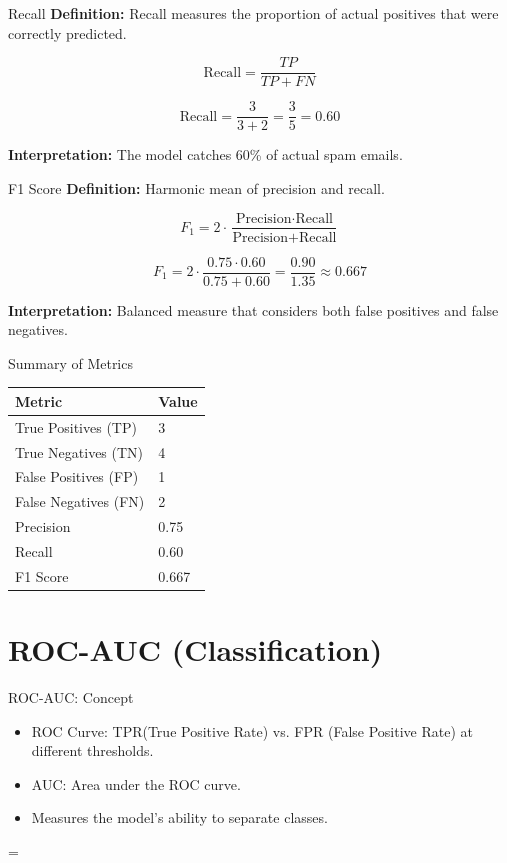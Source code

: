 \documentclass{beamer}
\begin{document}
\begin{frame}{Recall}
\textbf{Definition:} Recall measures the proportion of actual positives that were correctly predicted.

\[
\text{Recall} = \frac{TP}{TP + FN}
\]

\[
\text{Recall} = \frac{3}{3 + 2} = \frac{3}{5} = 0.60
\]

\textbf{Interpretation:} The model catches 60\% of actual spam emails.
\end{frame}

\begin{frame}{F1 Score}
\textbf{Definition:} Harmonic mean of precision and recall.

\[
F_1 = 2 \cdot \frac{\text{Precision} \cdot \text{Recall}}{\text{Precision} + \text{Recall}}
\]

\[
F_1 = 2 \cdot \frac{0.75 \cdot 0.60}{0.75 + 0.60} = \frac{0.90}{1.35} \approx 0.667
\]

\textbf{Interpretation:} Balanced measure that considers both false positives and false negatives.
\end{frame}

\begin{frame}{Summary of Metrics}
\begin{tabular}{ll}
\toprule
\textbf{Metric} & \textbf{Value} \\
\midrule
True Positives (TP) & 3 \\
True Negatives (TN) & 4 \\
False Positives (FP) & 1 \\
False Negatives (FN) & 2 \\
\midrule
Precision & 0.75 \\
Recall & 0.60 \\
F1 Score & 0.667 \\
\bottomrule
\end{tabular}
\end{frame}


\section{ROC-AUC (Classification)}

\begin{frame}{ROC-AUC: Concept}
\begin{itemize}
  \item ROC Curve: TPR(True Positive Rate) vs. FPR (False Positive Rate) at different thresholds.
  \item AUC: Area under the ROC curve.
  \item Measures the model’s ability to separate classes.
\end{itemize}

 =  \\
\end{frame}
\end{document}
